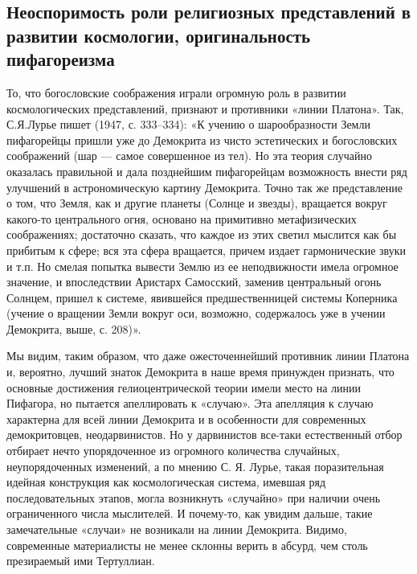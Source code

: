 \subsection{Неоспоримость  роли религиозных  представлений в  развитии
космологии, оригинальность пифагореизма}

То,  что  богословские соображения  играли  огромную  роль в  развитии
космологических представлений, признают  и противники «линии Платона».
Так, С.Я.Лурье пишет  (1947, с. 333--334): «К  учению о шарообразности
Земли  пифагорейцы пришли  уже до  Демокрита из  чисто эстетических  и
богословских соображений  (шар --- самое  совершенное из тел).  Но эта
теория случайно  оказалась правильной  и дала  позднейшим пифагорейцам
возможность внести ряд улучшений  в астрономическую картину Демокрита.
Точно так  же представление  о том,  что Земля,  как и  другие планеты
(Солнце  и  звезды),  вращается вокруг  какого-то  центрального  огня,
основано   на  примитивно   метафизических  соображениях;   достаточно
сказать, что каждое  из этих светил мыслится как бы  прибитым к сфере;
вся эта сфера  вращается, причем издает гармонические звуки  и т.п. Но
смелая  попытка  вывести  Землю  из ее  неподвижности  имела  огромное
значение,  и  впоследствии  Аристарх  Самосский,  заменив  центральный
огонь Солнцем,  пришел к  системе, явившейся  предшественницей системы
Коперника (учение  о вращении Земли вокруг  оси, возможно, содержалось
уже в учении Демокрита, выше, с. 208)».

Мы  видим, таким  образом,  что даже  ожесточеннейший противник  линии
Платона и,  вероятно, лучший знаток  Демокрита в наше  время принужден
признать,  что  основные  достижения  гелиоцентрической  теории  имели
место  на линии  Пифагора, но  пытается апеллировать  к «случаю».  Эта
апелляция к случаю характерна для всей линии Демокрита и в особенности
для  современных  демокритовцев,   неодарвинистов.  Но  у  дарвинистов
все-таки естественный отбор отбирает  нечто упорядоченное из огромного
количества  случайных, неупорядоченных  изменений, а  по мнению  С. Я.
Лурье,  такая поразительная  идейная  конструкция как  космологическая
система,  имевшая   ряд  последовательных  этапов,   могла  возникнуть
«случайно»  при  наличии  очень   ограниченного  числа  мыслителей.  И
почему-то,  как   увидим  дальше,  такие  замечательные   «случаи»  не
возникали  на линии  Демокрита.  Видимо,  современные материалисты  не
менее склонны верить в абсурд, чем столь презираемый ими Тертуллиан.

